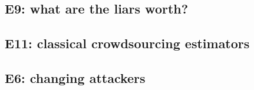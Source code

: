 \subsection{E9: what are the liars worth?}\label{sec:budget}


\subsection{E11: classical crowdsourcing estimators}\label{sec:crowd}


\subsection{E6: changing attackers}\label{sec:online}


\begin{table}[t]
\centering\small
\caption{Significant wins/ties/losses of \race\ against each baseline (Holm-corrected Wilcoxon signed-rank and paired bootstrap interval must agree, $\alpha=0.05$, task as unit).}\label{tab:wtl}

\end{table}
